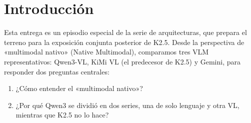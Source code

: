 \section{Introducción}

Esta entrega es un episodio especial de la serie de arquitecturas, que prepara el terreno para la exposición conjunta posterior de K2.5. Desde la perspectiva de «multimodal nativo» (Native Multimodal), comparamos tres VLM representativos: Qwen3-VL, KiMi VL (el predecesor de K2.5) y Gemini, para responder dos preguntas centrales:
\begin{enumerate}
  \item ¿Cómo entender el «multimodal nativo»?
  \item ¿Por qué Qwen3 se dividió en dos series, una de solo lenguaje y otra VL, mientras que K2.5 no lo hace?
\end{enumerate}


